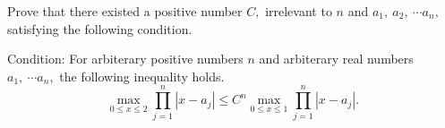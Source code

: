Prove that  there existed a positive number $C,$ irrelevant to $n$ and $a_1,\ a_2,\ \cdots a_n,$ satisfying the following condition.

Condition: For arbiterary positive numbers $n$ and arbiterary real numbers $a_1,\ \cdots a_n,$ the following inequality holds.\[ \max_{0\leq x\leq 2}\prod_{j=1}^n |x-a_j|\leq C^n \max_{0\leq x\leq 1}\prod_{j=1}^n |x-a_j|. \]